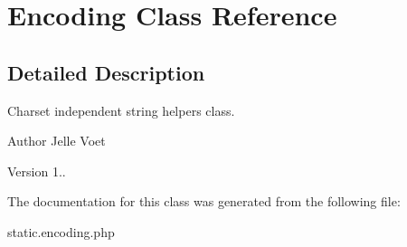\hypertarget{class_encoding}{\section{Encoding Class Reference}
\label{class_encoding}
}


\subsection{Detailed Description}
Charset independent string helpers class.

\begin{DoxyAuthor}{Author}
Jelle Voet 
\end{DoxyAuthor}
\begin{DoxyVersion}{Version}
1.. 
\end{DoxyVersion}


The documentation for this class was generated from the following file\-:\begin{DoxyCompactItemize}
\item 
static.\-encoding.\-php\end{DoxyCompactItemize}
